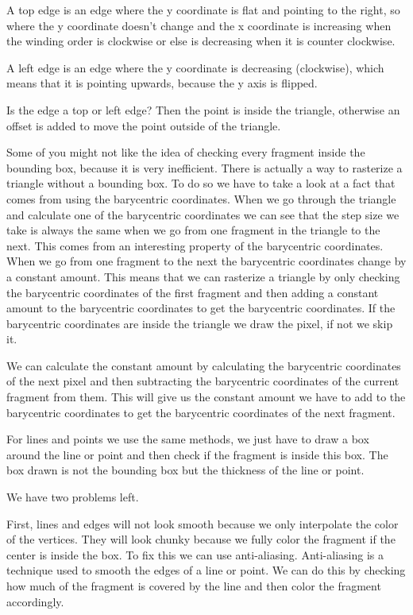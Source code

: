 \documentclass[12pt]{report} \usepackage{preamble}
\begin{document}
A top edge is an edge where the y coordinate is flat and pointing to the right,
so where the y coordinate doesn't change
and the x coordinate is increasing when the winding order is clockwise
or else is decreasing when it is counter clockwise.

A left edge is an edge where the y coordinate is decreasing (clockwise),
which means that it is pointing upwards, because the y axis is flipped.

Is the edge a top or left edge? Then the point is inside the triangle,
otherwise an offset is added to move the point outside of the triangle.

Some of you might not like the idea of checking every fragment inside the bounding box,
because it is very inefficient. There is actually a way to rasterize
a triangle without a bounding box. To do so we have to take a look at
a fact that comes from using the barycentric coordinates.
When we go through the triangle and calculate one of the barycentric coordinates
we can see that the step size we take is always the same
when we go from one fragment in the triangle to the next.
This comes from an interesting property of the barycentric coordinates.
When we go from one fragment to the next the barycentric coordinates
change by a constant amount. This means that we can rasterize a triangle by only checking
the barycentric coordinates of the first fragment and then adding a constant amount
to the barycentric coordinates to get the barycentric coordinates.
If the barycentric coordinates are inside the triangle we draw the pixel, if not we skip it.

We can calculate the constant amount by calculating the barycentric coordinates
of the next pixel and then subtracting the barycentric coordinates
of the current fragment from them. This will give us the constant amount we have to add
to the barycentric coordinates to get the barycentric coordinates of the next fragment.

For lines and points we use the same methods, we just have to draw a box
around the line or point and then check if the fragment is inside this box.
The box drawn is not the bounding box but the thickness of the line or point.

We have two problems left.

First, lines and edges will not look smooth because we only interpolate the color of the vertices.
They will look chunky because we fully color the fragment if the center is inside the box.
To fix this we can use anti-aliasing. Anti-aliasing is a technique used to
smooth the edges of a line or point. We can do this by checking how much of the fragment
is covered by the line and then color the fragment accordingly.
\end{document}
